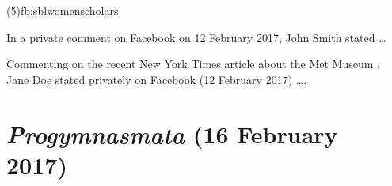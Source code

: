 \documentclass[a4paper]{article}
\begin{document}
\examplecite(5){fb:sblwomenscholars}
\begin{verbcite}
  In a private comment on Facebook on 12 February 2017, John Smith stated …
\end{verbcite}
\begin{verbcite}
  Commenting on the recent New York Times article about the Met Museum
  \parencite{barone:2017}, Jane Doe stated privately on Facebook (12 February
  2017) ….
\end{verbcite}
\examplebibliography
{}

\section{\emph{Progymnasmata} (16 February 2017)}
\end{document}
